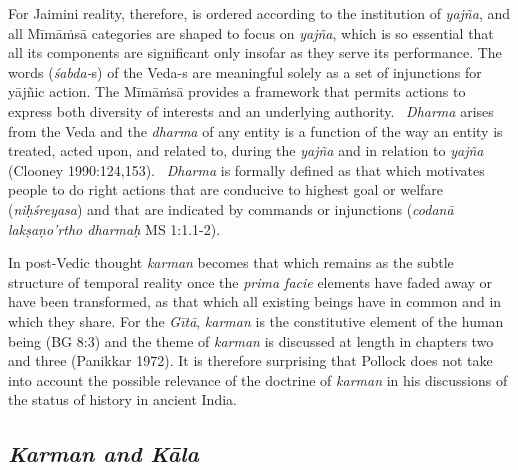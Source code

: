 \vskip 2pt

For Jaimini reality, therefore, is ordered according to the institution of \textit{yajña}, and all Mīmāṁsā categories are shaped to focus on \textit{yajña}, which is so essential that all its components are significant only insofar as they serve its performance. The words (\textit{śabda-}s) of the Veda-s are meaningful solely as a set of injunctions for yājñic action. The Mīmāṁsā provides a framework that permits actions to express both diversity of interests and an underlying authority.  \textit{Dharma} arises from the Veda and the \textit{dharma} of any entity is a function of the way an entity is treated, acted upon, and related to, during the \textit{yajña} and in relation to \textit{yajña} (Clooney 1990:124,153).  \textit{Dharma} is formally defined as that which motivates people to do right actions that are conducive to highest goal or welfare (\textit{niḥśreyasa}) and that are indicated by commands or injunctions (\textit{codanā lakṣaṇo'rtho dharmaḥ} MS 1:1.1-2).

\vskip 2pt

In post-Vedic thought \textit{karman} becomes that which remains as the subtle structure of temporal reality once the \textit{prima facie} elements have faded away or have been transformed, as that which all existing beings have in common and in which they share. For the \textit{Gītā}, \textit{karman} is the constitutive element of the human being (BG 8:3) and the theme of \textit{karman} is discussed at length in chapters two and three (Panikkar 1972). It is therefore surprising that Pollock does not take into account the possible relevance of the doctrine of \textit{karman} in his discussions of the status of history in ancient India.

\subsection*{\textit{Karman and Kāla}}

